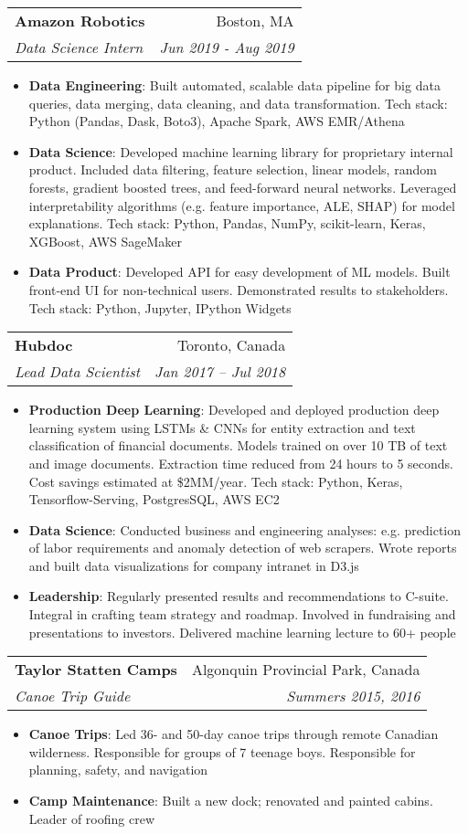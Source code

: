 \documentclass[letterpaper,11pt]{article}
\makeatletter
\newcommand{\resumeItem}[2]{
  \item\small{
    \textbf{#1}{: #2 \vspace{-2pt}}
  }
}
\newcommand{\resumeSubheading}[4]{
  \vspace{-1pt}\item
    \begin{tabular*}{0.97\textwidth}[t]{l@{\extracolsep{\fill}}r}
      \textbf{#1} & #2 \\
      \textit{\small#3} & \textit{\small #4} \\
    \end{tabular*}\vspace{-5pt}
}
\newcommand{\resumeItemListStart}{\begin{itemize}}
\newcommand{\resumeItemListEnd}{\end{itemize}\vspace{-5pt}}
\makeatother
\begin{document}
  \resumeSubheading
    {Amazon Robotics}{Boston, MA}
    {Data Science Intern}{Jun 2019 - Aug 2019}
    \resumeItemListStart
      \resumeItem{Data Engineering}
        {Built automated, scalable data pipeline for big data queries, data merging, data cleaning, and data transformation.
        Tech stack: Python (Pandas, Dask, Boto3), Apache Spark, AWS EMR/Athena}
      \resumeItem{Data Science}
        {Developed machine learning library for proprietary internal product. Included data filtering, feature selection,
        linear models, random forests, gradient boosted trees, and feed-forward neural networks. Leveraged interpretability algorithms
        (e.g. feature importance, ALE, SHAP) for model explanations. Tech stack: Python, Pandas, NumPy, scikit-learn, Keras, XGBoost, AWS SageMaker}
      \resumeItem{Data Product}
        {Developed API for easy development of ML models. Built front-end UI for non-technical users. Demonstrated
        results to stakeholders. Tech stack: Python, Jupyter, IPython Widgets}
    \resumeItemListEnd

    \resumeSubheading
      {Hubdoc}{Toronto, Canada}
      {Lead Data Scientist}{Jan 2017 -- Jul 2018}
      \resumeItemListStart
        \resumeItem{Production Deep Learning}
          {Developed and deployed production deep learning system using LSTMs \& CNNs for entity extraction and
          text classification of financial documents. Models trained on over 10 TB of text and image documents.
          Extraction time reduced from 24 hours to 5 seconds. Cost savings estimated at \$2MM/year.
          Tech stack: Python, Keras, Tensorflow-Serving, PostgresSQL, AWS EC2}
        \resumeItem{Data Science}
          {Conducted business and engineering analyses: e.g. prediction of labor requirements and anomaly detection of web
          scrapers. Wrote reports and built data visualizations for company intranet in D3.js}
        \resumeItem{Leadership}
          {Regularly presented results and recommendations to C-suite. Integral in crafting team strategy and
          roadmap. Involved in fundraising and presentations to investors. Delivered machine learning lecture to 60+ people}
      \resumeItemListEnd

    \resumeSubheading
      {Taylor Statten Camps}{Algonquin Provincial Park, Canada}
      {Canoe Trip Guide}{Summers 2015, 2016}
      \resumeItemListStart
        \resumeItem{Canoe Trips}
          {Led 36- and 50-day canoe trips through remote Canadian wilderness. Responsible for groups of 7 teenage boys.
           Responsible for planning, safety, and navigation}
        \resumeItem{Camp Maintenance}
          {Built a new dock; renovated and painted cabins. Leader of roofing crew}
      \resumeItemListEnd
\end{document}
